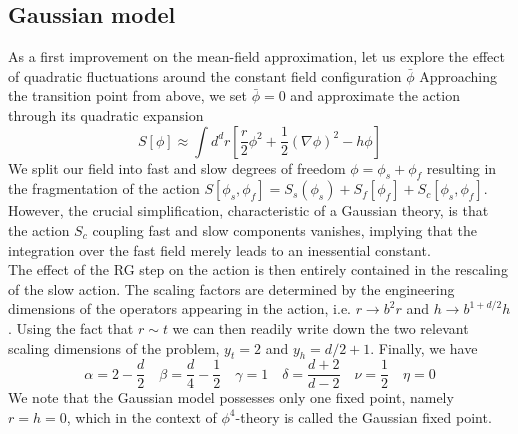 \subsection{Gaussian model}
As a first improvement on the mean-field approximation, let us explore the effect of quadratic fluctuations around the constant field configuration $\bar{\phi}$ Approaching the transition point from above, we set $\bar{\phi} = 0$ and approximate the action through its quadratic expansion
\[S[\phi] \approx \int d^dr \left[ \frac{r}{2}\phi^2 + \frac{1}{2}(\nabla\phi)^2- h\phi \right]\]
We split our field into fast and slow degrees of freedom $\phi = \phi_s + \phi_f$ resulting in the fragmentation of the action $S[\phi_s,\phi_f] = S_s(\phi_s) + S_f[\phi_f] + S_c[\phi_s,\phi_f]$. 
However, the crucial simplification, characteristic of a Gaussian theory, is that the action $S_c$ coupling fast and slow components vanishes, implying that the integration over the fast field merely leads to an inessential constant. 
\\
The effect of the RG step on the action is then entirely contained in the rescaling of the slow action. The scaling factors are determined by the engineering dimensions of the operators appearing in the action, i.e. $r \to b^2r$ and $h \to b^{1+d/2}h$. Using the fact that $r \sim t$ we can then readily write down the two relevant scaling dimensions of the problem, $y_t = 2$ and $y_h = d/2 + 1$. Finally, we have
\[\alpha = 2 - \frac{d}{2} \quad \beta = \frac{d}{4} - \frac{1}{2} \quad \gamma = 1 \quad \delta = \frac{d+2}{d-2} \quad \nu = \frac{1}{2} \quad \eta = 0\]
We note that the Gaussian model possesses only one fixed
point, namely $r = h = 0$, which in the context of $\phi^4$-theory is called the Gaussian fixed point.

